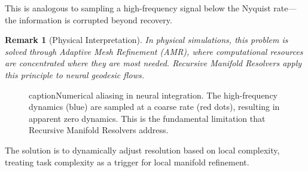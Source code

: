 \documentclass[12pt,letterpaper,twoside]{article}
\newtheorem{remarque}{Remark}[section]
\begin{document}
This is analogous to sampling a high-frequency signal below the Nyquist rate---the information is corrupted beyond recovery.

\begin{remarque}[Physical Interpretation]
In physical simulations, this problem is solved through Adaptive Mesh Refinement (AMR), where computational resources are concentrated where they are most needed. Recursive Manifold Resolvers apply this principle to neural geodesic flows.
\end{remarque}

\begin{figure}[htbp]
\centering
{}
caption{Numerical aliasing in neural integration. The high-frequency dynamics (blue) are sampled at a coarse rate (red dots), resulting in apparent zero dynamics. This is the fundamental limitation that Recursive Manifold Resolvers address.}
\label{fig:aliasing-problem}
\end{figure}

The solution is to dynamically adjust resolution based on local complexity, treating task complexity as a trigger for local manifold refinement.
\end{document}
